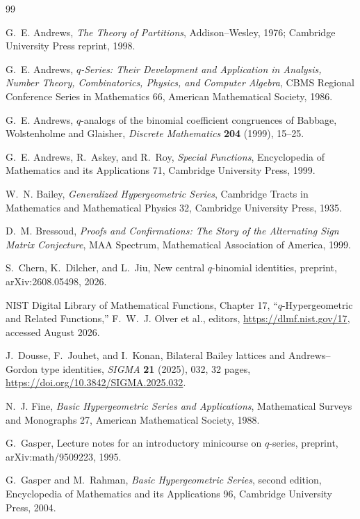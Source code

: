 \documentclass[11pt,a4paper,oneside,openany]{book}
\theoremstyle{definition}
\theoremstyle{remark}
\begin{document}
\begin{thebibliography}{99}

G.~E. Andrews,
\emph{The Theory of Partitions},
Addison--Wesley, 1976; Cambridge University Press reprint, 1998.

G.~E. Andrews,
\emph{$q$-Series: Their Development and Application in Analysis, Number Theory, Combinatorics, Physics, and Computer Algebra},
CBMS Regional Conference Series in Mathematics 66, American Mathematical Society, 1986.

G.~E. Andrews,
$q$-analogs of the binomial coefficient congruences of Babbage, Wolstenholme and Glaisher,
\emph{Discrete Mathematics} \textbf{204} (1999), 15--25.

G.~E. Andrews, R.~Askey, and R.~Roy,
\emph{Special Functions},
Encyclopedia of Mathematics and its Applications 71, Cambridge University Press, 1999.

W.~N. Bailey,
\emph{Generalized Hypergeometric Series},
Cambridge Tracts in Mathematics and Mathematical Physics 32, Cambridge University Press, 1935.

D.~M. Bressoud,
\emph{Proofs and Confirmations: The Story of the Alternating Sign Matrix Conjecture},
MAA Spectrum, Mathematical Association of America, 1999.

S.~Chern, K.~Dilcher, and L.~Jiu,
New central $q$-binomial identities,
preprint, arXiv:2608.05498, 2026.

NIST Digital Library of Mathematical Functions,
Chapter 17, ``$q$-Hypergeometric and Related Functions,''
F.~W.~J. Olver et al., editors, \url{https://dlmf.nist.gov/17}, accessed August 2026.

J.~Dousse, F.~Jouhet, and I.~Konan,
Bilateral Bailey lattices and Andrews--Gordon type identities,
\emph{SIGMA} \textbf{21} (2025), 032, 32 pages,
\url{https://doi.org/10.3842/SIGMA.2025.032}.

N.~J. Fine,
\emph{Basic Hypergeometric Series and Applications},
Mathematical Surveys and Monographs 27, American Mathematical Society, 1988.

G.~Gasper,
Lecture notes for an introductory minicourse on $q$-series,
preprint, arXiv:math/9509223, 1995.

G.~Gasper and M.~Rahman,
\emph{Basic Hypergeometric Series}, second edition,
Encyclopedia of Mathematics and its Applications 96, Cambridge University Press, 2004.


\end{thebibliography}
\end{document}
